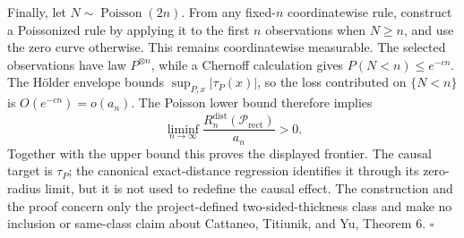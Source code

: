 Finally, let \(N\sim\operatorname{Poisson}(2n)\).  From any fixed-\(n\) coordinatewise rule, construct a Poissonized rule by applying it to the first \(n\) observations when \(N\geq n\), and use the zero curve otherwise.  This remains coordinatewise measurable.  The selected observations have law \(P^{\otimes n}\), while a Chernoff calculation gives \(P(N<n)\leq e^{-cn}\).  The H\"older envelope bounds \(\sup_{P,x}|\tau_P(x)|\), so the loss contributed on \(\{N<n\}\) is \(O(e^{-cn})=o(a_n)\).  The Poisson lower bound therefore implies
\[
 \liminf_{n\to\infty}
 \frac{R_n^{\mathrm{dist}}(\mathcal P_{\mathrm{rect}})}{a_n}>0.
\]
Together with the upper bound this proves the displayed frontier.  The causal target is \(\tau_P\); the canonical exact-distance regression identifies it through its zero-radius limit, but it is not used to redefine the causal effect.  The construction and the proof concern only the project-defined two-sided-thickness class and make no inclusion or same-class claim about Cattaneo, Titiunik, and Yu, Theorem 6. \(\square\)
